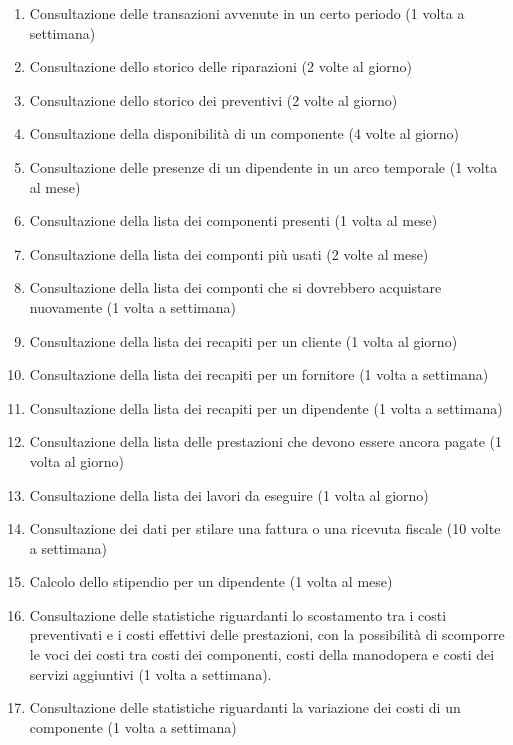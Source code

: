 \begin{enumerate}
			\item Consultazione delle transazioni avvenute in un certo periodo (1 volta a settimana)
			\item Consultazione dello storico delle riparazioni (2 volte al giorno)
			\item Consultazione dello storico dei preventivi (2 volte al giorno)
			\item Consultazione della disponibilità di un componente (4 volte al giorno)
			\item Consultazione delle presenze di un dipendente in un arco temporale (1 volta al mese)
			\item Consultazione della lista dei componenti presenti (1 volta al mese)
			\item Consultazione della lista dei componti più usati (2 volte al mese)
			\item Consultazione della lista dei componti che si dovrebbero acquistare nuovamente (1 volta a settimana)
			\item Consultazione della lista dei recapiti per un cliente (1 volta al giorno)
			\item Consultazione della lista dei recapiti per un fornitore (1 volta a settimana)
			\item Consultazione della lista dei recapiti per un dipendente (1 volta a settimana)
			\item Consultazione della lista delle prestazioni che devono essere ancora pagate (1 volta al giorno)
			\item Consultazione della lista dei lavori da eseguire (1 volta al giorno)
			\item Consultazione dei dati per stilare una fattura o una ricevuta fiscale (10 volte a settimana)
			\item Calcolo dello stipendio per un dipendente (1 volta al mese)
			\item Consultazione delle statistiche riguardanti lo scostamento tra i costi preventivati e i costi effettivi delle prestazioni, con la possibilità di scomporre le voci dei costi tra costi dei componenti, costi della manodopera e costi dei servizi aggiuntivi (1 volta a settimana).
			\item Consultazione delle statistiche riguardanti la variazione dei costi di un componente (1 volta a settimana)
			
		\end{enumerate}
